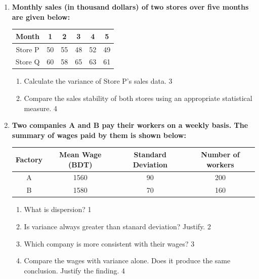 \documentclass[a4paper,oneside]{book}
\begin{document}
\begin{enumerate}
  \begin{enumerate}
    \item  
	Find the Mean Deviation about the mean for the scores of Student A.  \hfill 3  
    \item  
	Which student has more consistent performance? Justify using statistical measures.  \hfill 4  
\end{enumerate}  

\item  
  \textbf{Monthly sales (in thousand dollars) of two stores over five months are given below:}

\begin{table}[h]
\centering
\begin{tabular}{c|ccccc}
Month     & 1  & 2  & 3  & 4  & 5  \\ \hline
Store P  & 50 & 55 & 48 & 52 & 49 \\
Store Q  & 60 & 58 & 65 & 63 & 61
\end{tabular}
\end{table}

  \begin{enumerate}
    \item  
	Calculate the variance of Store P’s sales data.  \hfill 3  
    \item  
	Compare the sales stability of both stores using an appropriate statistical measure.  \hfill 4  
\end{enumerate}  


 \item
	  \textbf{Two companies A and B pay their workers on a weekly basis. The summary of wages paid by them is shown below:} 
	  
	  \begin{table}[h]
	  \centering
\begin{tabular}{c|ccc}
Factory & Mean Wage (BDT) & Standard Deviation & Number of workers \\ \hline
A       & 1560       & 90                 & 200               \\ 
B       & 1580       & 70                 & 160              
\end{tabular}
\end{table}
  
  \begin{enumerate}
    \item
	What is dispersion? \hfill 1
    \item
	Is variance always greater than stanard deviation? Justify. \hfill 2
    \item  
	Which company is more consistent with their wages? \hfill 3
    \item
	Compare the wages with variance alone. Does it produce the same conclusion. Justify the finding. \hfill 4
  \end{enumerate}
  

\end{enumerate}
\end{document}
